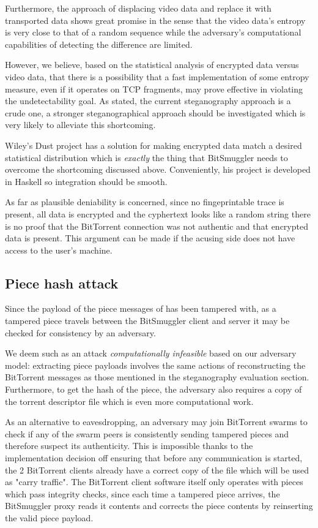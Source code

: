 \documentclass[11pt]{book} %
\newcommand{\projectName}{BitSmuggler }
\begin{document}
Furthermore, the approach of displacing video data and replace it with transported data shows great promise in the sense that the video data's entropy is very close to that of a random sequence while the adversary's computational capabilities of detecting the difference are limited.

However, we believe, based on the statistical analysis of encrypted data versus video data, that there is a possibility that a fast implementation of some entropy measure, even if it operates on TCP fragments, may prove effective in violating the undetectability goal. As stated, the current steganography approach is a crude one, a stronger steganographical approach should be investigated which is very likely to alleviate this shortcoming. 

Wiley's Dust project \citep*{web:dust} has a solution for making encrypted data match a desired statistical distribution which is \textit{exactly} the thing that \projectName needs to overcome the shortcoming discussed above. Conveniently, his project is developed in Haskell so integration should be smooth.

As far as plausible deniability is concerned, since no fingeprintable trace is present, all data is encrypted and the cyphertext looks like a random string there is no proof that the BitTorrent connection was not authentic and that encrypted data is present. This argument can be made if the acusing side does not have access to the user's machine.

\subsection{Piece hash attack}

Since the payload of the piece messages of has been tampered with, as a tampered piece travels between the \projectName client and server it may be checked for consistency by an adversary.

We deem such as an attack \textit{computationally infeasible} based on our adversary model: extracting piece payloads involves the same actions of reconstructing the BitTorrent messages as those mentioned in the steganography evaluation section. Furthermore, to get the hash of the piece, the adversary also requires a copy of the torrent descriptor file which is even more computational work.

As an alternative to eavesdropping, an adversary may join BitTorrent swarms to check if any of the swarm peers is consistently sending tampered pieces and therefore suspect its authenticity. This is impossible thanks to the implementation decision off ensuring that before any communication is started, the 2 BitTorrent clients already have a correct copy of the file which will be used as "carry traffic". The BitTorrent client software itself only operates with pieces which pass integrity checks, since each time a tampered piece arrives, the \projectName proxy reads it contents and corrects the piece contents by reinserting the valid piece payload. 
\end{document}
